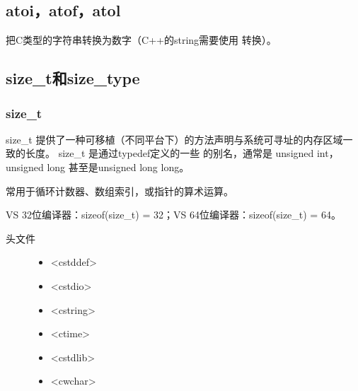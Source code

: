 \documentclass[letterpaper,10pt,english]{sphinxmanual}
\begin{document}
\subsection{atoi，atof，atol}
\label{\detokenize{cpp/19_stl:atoi-atof-atol}}
%
\begin{sphinxVerbatim}[commandchars=\\\{\}]
 
\end{sphinxVerbatim}

把C类型的字符串转换为数字（C++的string需要使用  转换）。

%
\begin{sphinxVerbatim}[commandchars=\\\{\}]
     
    
        
\end{sphinxVerbatim}


\subsection{size\_t和size\_type}
\label{\detokenize{cpp/19_stl:size-tsize-type}}

\subsubsection{size\_t}
\label{\detokenize{cpp/19_stl:size-t}}
size\_t 提供了一种可移植（不同平台下）的方法声明与系统可寻址的内存区域一致的长度。
size\_t 是通过typedef定义的一些  的别名，通常是 unsigned int，unsigned long 甚至是unsigned long long。

常用于循环计数器、数组索引，或指针的算术运算。

VS 32位编译器：sizeof(size\_t) = 32；VS 64位编译器：sizeof(size\_t) = 64。
\begin{description}
\item[{头文件}] \leavevmode\begin{itemize}
\item {} 
\textless{}cstddef\textgreater{}

\item {} 
\textless{}cstdio\textgreater{}

\item {} 
\textless{}cstring\textgreater{}

\item {} 
\textless{}ctime\textgreater{}

\item {} 
\textless{}cstdlib\textgreater{}

\item {} 
\textless{}cwchar\textgreater{}

\end{itemize}

\end{description}
\end{document}
